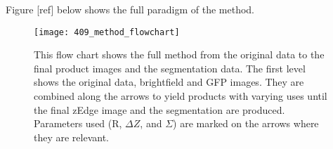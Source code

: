 Figure [ref] below shows the full paradigm of the method.
\begin{figure}[p]
 \centering
 \texttt{[image: 409\_method\_flowchart]}
 \caption[Method flow chart]{
 	This flow chart shows the full method from the original data to the final product images and the segmentation data. The first level shows the original data, brightfield and GFP images. They are combined along the arrows to yield products with varying uses until the final zEdge image and the segmentation are produced. Parameters used (R, $\Delta Z$, and $\Sigma$) are marked on the arrows where they are relevant.
 }
 \label{fig:flowchart}
\end{figure}
